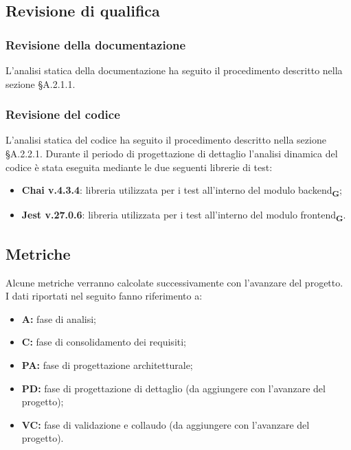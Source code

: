 \subsection{Revisione di qualifica}
\subsubsection{Revisione della documentazione}
L'analisi statica della documentazione ha seguito il procedimento descritto nella sezione §A.2.1.1.
\subsubsection{Revisione del codice}
L'analisi statica del codice ha seguito il procedimento descritto nella sezione §A.2.2.1.
Durante il periodo di progettazione di dettaglio l'analisi dinamica del codice è stata eseguita mediante le due seguenti librerie di test:
\begin{itemize}
    \item \textbf{Chai v.4.3.4}: libreria utilizzata per i test all'interno del modulo backend\textsubscript{\textbf{G}};
    \item \textbf{Jest v.27.0.6}: libreria utilizzata per i test all'interno del modulo frontend\textsubscript{\textbf{G}}.
\end{itemize}
\subsection{Metriche}
Alcune metriche verranno calcolate successivamente con l'avanzare del progetto.\\
I dati riportati nel seguito fanno riferimento a:
\begin{itemize}
    \item \textbf{A:} fase di analisi;
    \item \textbf{C:} fase di consolidamento dei requisiti;
    \item \textbf{PA:} fase di progettazione architetturale;
    \item \textbf{PD:} fase di progettazione di dettaglio (da aggiungere con l'avanzare del progetto);
    \item \textbf{VC:} fase di validazione e collaudo (da aggiungere con l'avanzare del progetto).
\end{itemize}
\newpage
